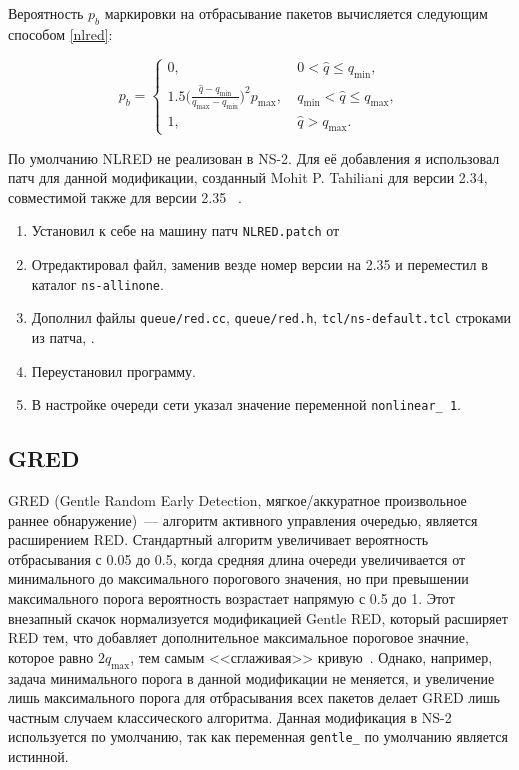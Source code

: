 Вероятность $p_{b}$ маркировки на
отбрасывание пакетов вычисляется следующим способом \eqref{nlred}:

\begin{equation}
\label{nlred}
p_{b} = \begin{cases}
        0, &  \ 0 < \hat{q} \leqslant q_{\min},
        \\
        1.5({\frac{\hat{q} - q_{\min}}{q_{\max} - q_{\min}})^2} {p_{\max}}, & \ q_{\min} < \hat{q} \leqslant q_{\max},
        \\
        1, &  \ \hat{q} > q_{\max}.
\end{cases}
\end{equation}


По умолчанию NLRED не реализован в NS-2. Для её добавления я использовал патч для данной модификации, созданный Mohit
  P. Tahiliani для версии 2.34, совместимой также для версии 2.35 ~\cite{nlredpatch}. 
  
\begin{enumerate}
\item Установил к себе на машину патч \verb|NLRED.patch| от 
\item Отредактировал файл, заменив везде номер версии на 2.35 и переместил в каталог \verb|ns-allinone|.
\item Дополнил файлы \verb|queue/red.cc|, \verb|queue/red.h|, \verb|tcl/ns-default.tcl| строками из патча, .
\item Переустановил программу.
\item В настройке очереди сети указал значение переменной \verb|nonlinear_ 1|.
\end{enumerate}

\subsection{GRED}

GRED (Gentle Random Early Detection, мягкое/аккуратное произвольное
раннее обнаружение)~--- алгоритм активного управления очередью,
является расширением RED. Стандартный алгоритм увеличивает
вероятность отбрасывания с 0.05 до 0.5, когда средняя длина очереди
увеличивается от минимального до максимального порогового значения, но
при превышении максимального порога вероятность возрастает напрямую с
0.5 до 1.  Этот внезапный скачок нормализуется модификацией Gentle
RED, который расширяет RED тем, что добавляет дополнительное
максимальное пороговое значние, которое равно $2q_{\max}$, тем самым
<<сглаживая>> кривую~\cite{GRED}. Однако, например, задача минимального порога в данной модификации не меняется, 
и увеличение лишь максимального порога для отбрасывания всех пакетов делает GRED лишь частным случаем классического алгоритма. 
Данная модификация в NS-2 используется по умолчанию, так как переменная \verb|gentle_| по умолчанию 
является истинной. 

